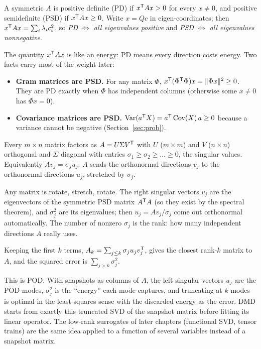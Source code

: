 \begin{definition}
A symmetric $A$ is positive definite (PD) if $x^{\mathsf{T}} A x > 0$ for every $x \ne 0$, and positive semidefinite (PSD) if
$x^{\mathsf{T}} A x \ge 0$. Write $x = Q c$ in eigen-coordinates; then $x^{\mathsf{T}} A x = \sum_i \lambda_i c_i^2$, so
\emph{PD $\iff$ all eigenvalues positive} and \emph{PSD $\iff$ all eigenvalues nonnegative}.
\end{definition}
The quantity $x^{\mathsf{T}} A x$ is like an energy: PD means every direction costs energy. Two facts carry most of the weight
later:
\begin{itemize}[nosep]
  \item \textbf{Gram matrices are PSD.} For any matrix $\Phi$, $x^{\mathsf{T}}(\Phi^{\mathsf{T}}\Phi)x = \lVert \Phi x\rVert^2 \ge 0$. They are
        PD exactly when $\Phi$ has independent columns (otherwise some $x \ne 0$ has $\Phi x = 0$).
  \item \textbf{Covariance matrices are PSD.} $\operatorname{Var}(a^{\mathsf{T}} X) = a^{\mathsf{T}} \operatorname{Cov}(X)\, a \ge 0$ because a variance cannot be
        negative (Section~\ref{sec:prob}).
\end{itemize}

\begin{result}
Every $m \times n$ matrix factors as $A = U \Sigma V^{\mathsf{T}}$ with $U$ ($m\times m$) and $V$ ($n\times n$) orthogonal and
$\Sigma$ diagonal with entries $\sigma_1 \ge \sigma_2 \ge \dots \ge 0$, the singular values. Equivalently
$A v_j = \sigma_j u_j$: $A$ sends the orthonormal directions $v_j$ to the orthonormal directions $u_j$, stretched by
$\sigma_j$.
\end{result}
\begin{intuition}
Any matrix is rotate, stretch, rotate. The right singular vectors $v_j$ are the eigenvectors of the symmetric PSD
matrix $A^{\mathsf{T}} A$ (so they exist by the spectral theorem), and $\sigma_j^2$ are its eigenvalues; then
$u_j = A v_j/\sigma_j$ come out orthonormal automatically. The number of nonzero $\sigma_j$ is the rank: how many
independent directions $A$ really uses.
\end{intuition}

\begin{result}
\label{res:eckart}
Keeping the first $k$ terms, $A_k = \sum_{j\le k} \sigma_j u_j v_j^{\mathsf{T}}$, gives the closest rank-$k$ matrix to $A$,
and the squared error is $\sum_{j>k} \sigma_j^2$.
\end{result}
\begin{connection}
This is POD. With snapshots as columns of $A$, the left singular vectors $u_j$ are the POD modes, $\sigma_j^2$ is the
``energy'' each mode captures, and truncating at $k$ modes is optimal in the least-squares sense with the discarded
energy as the error. DMD starts from exactly this truncated SVD of the snapshot matrix before fitting its linear
operator. The low-rank surrogates of later chapters (functional SVD, tensor trains) are the same idea applied to a
function of several variables instead of a snapshot matrix.
\end{connection}

